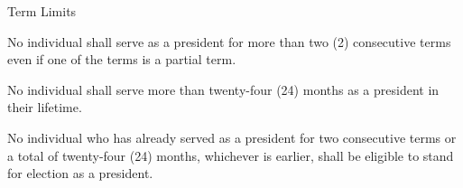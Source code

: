 
     \item{Term Limits}
     \begin{longenum}[label*=\arabic*., align=left]
     \item No individual shall serve as a president for more than two (2) consecutive terms even if one of the terms is a partial term.
     \item No individual shall serve more than twenty-four (24) months as a president in their lifetime.
     \item No individual who has already served as a president for two consecutive terms or a total of twenty-four (24) months, whichever is earlier, shall be eligible to stand for election as a president.
      \end{longenum}
